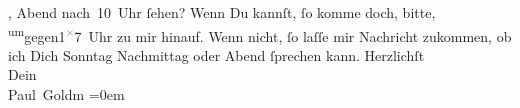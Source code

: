\begin{ledgroupsized}[t]{13cm}
                  \label{K_L03365-2v}\label{K_L03365-2h}, Abend
                  nach 10 Uhr ſehen? Wenn Du kannſt, ſo komme doch, bitte, \substVorne{}\textsuperscript{um}\substDazwischen{}gegen\substHinten{}{ }1\substVorne{}\textsuperscript{\textcolor{gray}{×}}\substDazwischen{}7\substHinten{} Uhr zu mir hinauf. Wenn {\pb}nicht, ſo laſſe
               mir Nachricht zukommen, ob ich Dich Sonntag{ }Nachmittag oder Abend ſprechen kann.\pend
           \pstart
           Herzlichſt {\\[\baselineskip]}Dein {\\[\baselineskip]}\spacefill\mbox{Paul Goldm}\pend
           \leftskip=0em{}
         
         \endnumbering{}\end{ledgroupsized}  \newcommand{\dateiname}{L03365}\newcommand{\titel}{Paul Goldmann an Arthur Schnitzler, 27. 2. [1903]}\newcommand{\editorInnen}{Martin Anton Müller und Laura Untner}
      